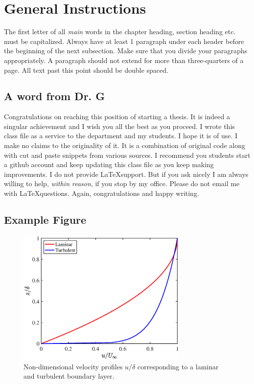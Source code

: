 \chapter{General Instructions}


The first letter of all \textit{main} words in the chapter heading, section heading etc. must be capitalized. Always have at least 1 paragraph under each header  before the beginning of the next subsection. Make sure that you divide your paragraphs appropriately. A paragraph should not extend for more than three-quarters of a page. All text past this point should be double spaced. 

\section{A word from Dr. G}
Congratulations on reaching this position of starting a thesis. It is indeed a singular achievement and I wish you all the best as you proceed. I wrote this class file as a service to the department and my students. I hope it is of use. I make no claims to the originality of it. It is a combination of original code along with cut and paste snippets from various sources. I recommend you students start a github account and keep updating this class file as you keep making improvements. I do not provide \LaTeX support. But if you ask nicely I am always willing to help, \textit{within reason}, if you stop by my office. Please do not email me with \LaTeX  questions. Again, congratulations and happy writing.

\section{Example Figure}

\begin{figure}[h]
	\centering 
	\includegraphics[clip = true,width=0.75\textwidth]{pics/velProf.eps}%
	\caption{Non-dimensional velocity profiles $u/\delta$ corresponding to a laminar and turbulent boundary layer.  }
	\label{fg:sampFig1}
\end{figure}

